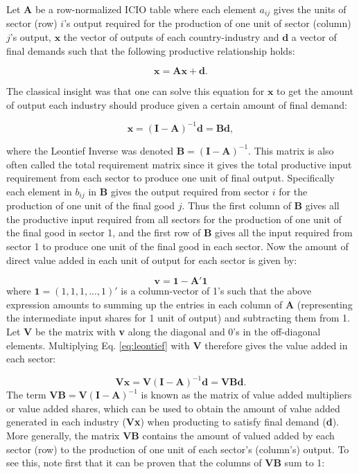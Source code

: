 \documentclass[a4paper]{article}
\begin{document}
Let $\textbf{A}$ be a row-normalized ICIO table where each element $a_{ij}$ gives the units of sector (row) $i$'s output required for the production of one unit of sector (column) $j$'s output, $\textbf{x}$ the vector of outputs of each country-industry and $\textbf{d}$ a vector of final demands such that the following productive relationship holds:

\begin{equation}
\textbf{x} = \textbf{A}\textbf{x} + \textbf{d}.
\end{equation}

The classical \citet{leontief1936quantitative} insight was that one can solve this equation for $\textbf{x}$ to get the amount of output each industry should produce given a certain amount of final demand:

\begin{equation} \label{eq:leontief}
\textbf{x} = (\textbf{I}-\textbf{A})^{-1} \textbf{d} = \textbf{B}\textbf{d},
\end{equation}

where the Leontief Inverse was denoted $\textbf{B} = (\textbf{I}-\textbf{A})^{-1}$. This matrix is also often called the total requirement matrix since it gives the total productive input requirement from each sector to produce one unit of final output. Specifically each element in $b_{ij}$ in \textbf{B} gives the output required from sector $i$ for the production  of one unit of the final good $j$. Thus the first column of \textbf{B} gives all the productive input required from all sectors for the production of one unit of the final good in sector 1, and the first row of \textbf{B} gives all the input required from sector 1 to produce one unit of the final good in each sector. Now the amount of direct value added in each unit of output for each sector is given by:

\begin{equation}
\textbf{v} = \textbf{1} - \textbf{A}'\textbf{1}
\end{equation}
where $\textbf{1} = (1, 1, 1, ..., 1)'$ is a column-vector of 1's such that the above expression amounts to summing up the entries in each column of \textbf{A} (representing the intermediate input shares for 1 unit of output) and subtracting them from 1. Let \textbf{V} be the matrix with \textbf{v} along the diagonal and 0's in the off-diagonal elements. Multiplying Eq. \ref{eq:leontief} with $\textbf{V}$ therefore gives the value added in each sector:

\begin{equation} \label{eq:VB}
\textbf{V}\textbf{x} = \textbf{V}(\textbf{I}-\textbf{A})^{-1} \textbf{d} = \textbf{VBd}.
\end{equation}
The term $\textbf{VB} = \textbf{V}(\textbf{I}-\textbf{A})^{-1}$ is known as the matrix of value added multipliers or value added shares, which can be used to obtain the amount of value added generated in each industry (\textbf{Vx}) when producting to satisfy final demand (\textbf{d}). More generally, the matrix $\textbf{VB}$ contains the amount of valued added by each sector (row) to the production of one unit of each sector's (column's) output.  To see this, note first that it can be proven that the columns of \textbf{VB} sum to 1:
\end{document}
